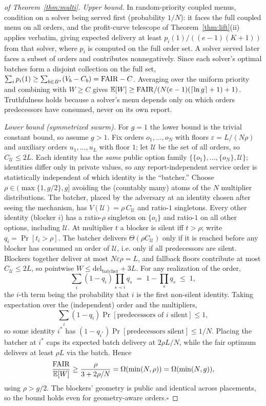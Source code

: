 \begin{proof}[of Theorem~\ref{thm:multi}]
\emph{Upper bound.} In random-priority coupled menus, condition on a
solver being served first (probability $1/N$): it faces the full coupled
menu on all orders, and the profit-curve telescope of
Theorem~\ref{thm:lift}(ii) applies verbatim, giving expected delivery at
least $p_i(1)/((e-1)(K+1))$ from that solver, where $p_i$ is computed on
the full order set. A solver served later faces a subset of orders and
contributes nonnegatively. Since each solver's optimal batches form a
disjoint collection on the full set, $\sum_i p_i(1)\ge\sum_{b\in
B^\ast}(V_b-C_b)=\mathrm{FAIR}-C$. Averaging over the uniform priority and
combining with $W\ge C$ gives
$\mathbb{E}[W]\ge\mathrm{FAIR}/(N(e-1)(\lceil\ln g\rceil+1)+1)$. Truthfulness holds
because a solver's menu depends only on which orders predecessors have
consumed, never on its own report.

\emph{Lower bound (symmetrized swarm).} For $g=1$ the lower bound is the
trivial constant bound, so assume $g>1$. Fix orders $o_1,\dots,o_N$ with
floors $\varepsilon=L/(N\rho)$ and auxiliary orders $u_1,\dots,u_L$ with
floor $1$; let $\mathcal U$ be the set of all orders, so
$C_{\mathcal U}\le2L$. Each identity
has the \emph{same} public option family
$\{\{o_1\},\ldots,\{o_N\},\mathcal U\}$; identities
differ only in private values, so any
report-independent service order is statistically independent of which
identity is the ``batcher.'' Choose $\rho\in(\max\{1,g/2\},g]$ avoiding
the (countably many) atoms of the $N$ multiplier distributions. The
batcher, placed by the adversary at an identity chosen after seeing the
mechanism, has $V(\mathcal U)=\rho\,C_{\mathcal U}$ and ratio-$1$
singletons. Every other identity (blocker $i$) has a ratio-$\rho$
singleton on $\{o_i\}$ and ratio-$1$ on all other options, including
$\mathcal U$. At multiplier $t$ a blocker is silent iff $t>\rho$;
write $q_i=\Pr[t_i>\rho]$. The batcher delivers
$\Theta(\rho C_{\mathcal U})$ only if
it is reached before any blocker has consumed an order of $\mathcal U$, i.e. only
if all predecessors are silent. Blockers together deliver at most
$N\varepsilon\rho=L$, and fallback floors contribute at most
$C_{\mathcal U}\le2L$,
so pointwise $W\le\mathrm{del}_{\mathrm{batcher}}+3L$. For any
realization of the order,
\[
\sum_{i}(1-q_i)\!\!\prod_{s\prec i}\!q_s \;=\; 1-\prod_s q_s \;\le\; 1,
\]
the $i$-th term being the probability that $i$ is the first non-silent
identity. Taking expectation over the (independent) order and the
multipliers,
\[
  \sum_i (1-q_i)\Pr[\text{predecessors of }i\text{ silent}] \le 1,
\]
so some identity $i^\ast$ has
$(1-q_{i^\ast})\Pr[\text{predecessors silent}]\le 1/N$. Placing the
batcher at $i^\ast$ caps its expected batch delivery at $2\rho L/N$,
while the fair optimum delivers at least $\rho L$ via the batch. Hence
\[
\frac{\mathrm{FAIR}}{\mathbb{E}[W]}\ge\frac{\rho}{3+2\rho/N}
=\Omega(\min(N,\rho))=\Omega(\min(N,g)),
\]
using $\rho>g/2$. The blockers' geometry is public and identical across
placements, so the bound holds even for geometry-aware orders.\hfill$\square$
\end{proof}

